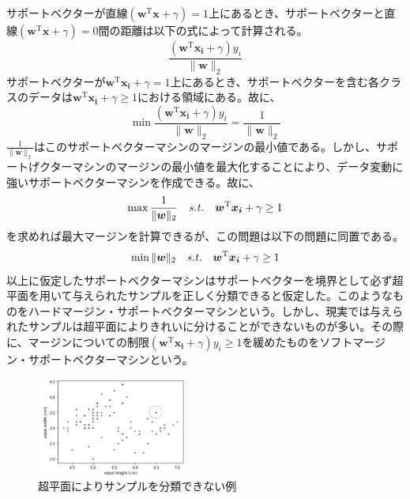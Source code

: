 サポートベクターが直線$(\bm{w}^{\mathrm{T}}\bm{x} + \gamma) = 1$上にあるとき、サポートベクターと直線$(\bm{w}^{\mathrm{T}}\bm{x} + \gamma) = 0$間の距離は以下の式によって計算される。
\begin{equation}
  \frac{(\bm{w}^{\mathrm{T}}\bm{x_i} + \gamma)y_i}{\|\bm{w}\|_2}
\end{equation}
サポートベクターが$\bm{w}^{\mathrm{T}}\bm{x_i} + \gamma = 1$上にあるとき、サポートベクターを含む各クラスのデータは$\bm{w}^{\mathrm{T}}\bm{x_i} + \gamma \ge 1$における領域にある。故に、
\begin{equation}
  \min\frac{(\bm{w}^{\mathrm{T}}\bm{x_i} + \gamma)y_i}{\|\bm{w}\|_2} = \frac{1}{\|\bm{w}\|_2}
\end{equation}
$\frac{1}{\|\bm{w}\|_2}$はこのサポートベクターマシンのマージンの最小値である。しかし、サポートげクターマシンのマージンの最小値を最大化することにより、データ変動に強いサポートベクターマシンを作成できる。故に、
\begin{equation}
  \max\frac{1}{\|\bm{w}\|_2}\text{\ \ \ }{\it{s.t.}}\text{\ \ \ }\bm{w}^{\mathrm{T}}\bm{x_i} + \gamma \ge 1
\end{equation}
を求めれば最大マージンを計算できるが、この問題は以下の問題に同置である。
\begin{equation}
  \min\|\bm{w}\|_2\text{\ \ \ }{\it{s.t.}}\text{\ \ \ }\bm{w}^{\mathrm{T}}\bm{x_i} + \gamma \ge 1
\end{equation}
以上に仮定したサポートベクターマシンはサポートベクターを境界として必ず超平面を用いて与えられたサンプルを正しく分類できると仮定した。このようなものをハードマージン・サポートベクターマシンという。しかし、現実では与えられたサンプルは超平面によりきれいに分けることができないものが多い。その際に、マージンについての制限$(\bm{w}^{\mathrm{T}}\bm{x_i} + \gamma)y_i \ge 1$を緩めたものをソフトマージン・サポートベクターマシンという。
\begin{figure}[h]
  \centering
  \includegraphics[width=5cm]{figure/section1/figure3.png}
  \caption{超平面によりサンプルを分類できない例}
\end{figure}
  



  




